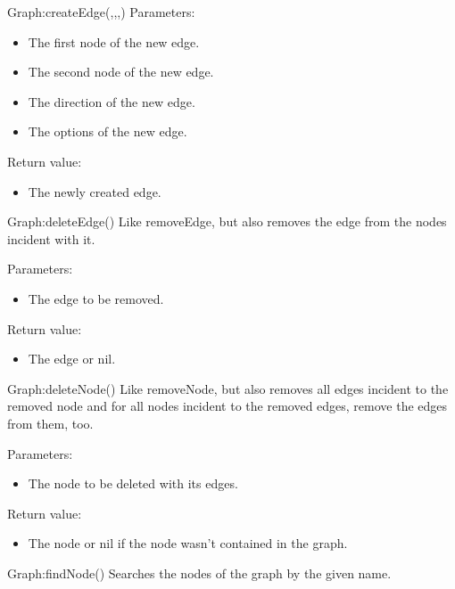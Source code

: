 \begin{luacommand}{{Graph:createEdge}(,,,)}
Parameters:
\begin{itemize}
	\item[]  \subitem The first node of the new edge.\item[]  \subitem The second node of the new edge.\item[]  \subitem The direction of the new edge.\item[]  \subitem The options of the new edge.
\end{itemize}


Return value:
\begin{itemize} \item[] The newly created edge. \end{itemize}


\end{luacommand}\begin{luacommand}{{Graph:deleteEdge}()}
Like removeEdge, but also removes the edge from the nodes incident with it.

Parameters:
\begin{itemize}
	\item[]  \subitem The edge to be removed.
\end{itemize}


Return value:
\begin{itemize} \item[] The edge or nil. \end{itemize}


\end{luacommand}\begin{luacommand}{{Graph:deleteNode}()}
Like removeNode, but also removes all edges incident to the removed node and for all nodes incident to the removed edges, remove the edges from them, too.

Parameters:
\begin{itemize}
	\item[]  \subitem The node to be deleted with its edges.
\end{itemize}


Return value:
\begin{itemize} \item[] The node or nil if the node wasn't contained in the graph. \end{itemize}


\end{luacommand}\begin{luacommand}{{Graph:findNode}()}
Searches the nodes of the graph by the given name.


\end{luacommand}
